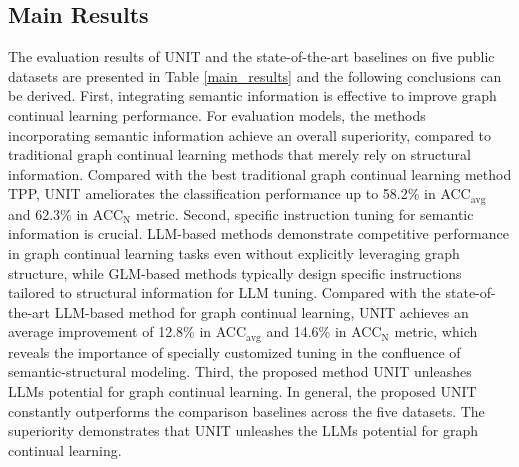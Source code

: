 \documentclass[sigconf]{acmart}
\begin{document}
\subsection{Main Results}
The evaluation results of UNIT and the state-of-the-art baselines on five public datasets are presented in Table \ref{main_results} and the following conclusions can be derived.
First, integrating semantic information is effective to improve graph continual learning performance.
For evaluation models, the methods incorporating semantic information achieve an overall superiority, compared to traditional graph continual learning methods that merely rely on structural information.
Compared with the best traditional graph continual learning method TPP, UNIT ameliorates the classification performance up to 58.2\% in ACC$_{\text{avg}}$ and 62.3\% in ACC$_{\text{N}}$ metric.
Second, specific instruction tuning for semantic information is crucial.
LLM-based methods demonstrate competitive performance in graph continual learning tasks even without explicitly leveraging graph structure, while GLM-based methods typically design specific instructions tailored to structural information for LLM tuning.
Compared with the state-of-the-art LLM-based method for graph continual learning, UNIT achieves an average improvement of 12.8\% in ACC$_{\text{avg}}$ and 14.6\% in ACC$_{\text{N}}$ metric, which reveals the importance of specially customized tuning in the confluence of semantic-structural modeling.
Third, the proposed method UNIT unleashes LLMs potential for graph continual learning.
In general, the proposed UNIT constantly outperforms the comparison baselines across the five datasets.
The superiority demonstrates that UNIT unleashes the LLMs potential for graph continual learning.
\end{document}
